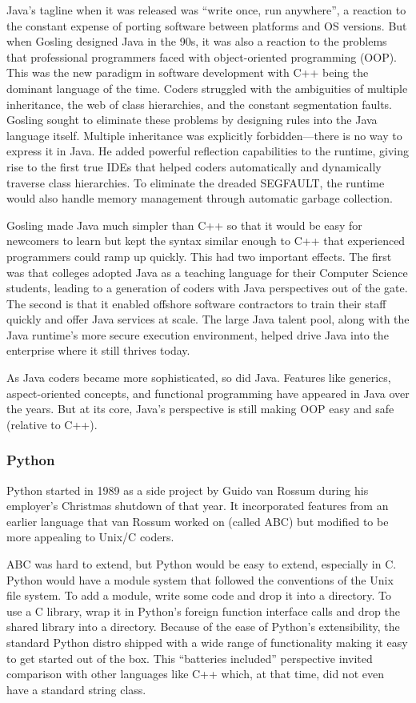 Java's tagline when it was released was ``write once, run anywhere'', a
reaction to the constant expense of porting software between platforms and OS
versions. But when Gosling designed Java in the 90s, it was also a reaction to
the problems that professional programmers faced with object-oriented
programming (OOP). This was the new paradigm in software development with C++
being the dominant language of the time. Coders struggled with the ambiguities
of multiple inheritance, the web of class hierarchies, and the constant
segmentation faults. Gosling sought to eliminate these problems by designing
rules into the Java language itself. Multiple inheritance was
explicitly forbidden---there is no way to express it in Java. He added
powerful reflection capabilities to the runtime, giving rise to the first true
IDEs that helped coders automatically and dynamically traverse class
hierarchies. To eliminate the dreaded SEGFAULT, the runtime would also handle
memory management through automatic garbage collection.

Gosling made Java much simpler than C++ so that it would be easy for newcomers
to learn but kept the syntax similar enough to C++ that experienced programmers
could ramp up quickly. This had two important effects. The first was that
colleges adopted Java as a teaching language for their Computer Science
students, leading to a generation of coders with Java perspectives out of the
gate. The second is that it enabled offshore software contractors to train
their staff quickly and offer Java services at scale. The large Java talent
pool, along with the Java runtime's more secure execution environment, helped
drive Java into the enterprise where it still thrives today.

As Java coders became more sophisticated, so did Java. Features like generics,
aspect-oriented concepts, and functional programming have appeared in Java over
the years. But at its core, Java's perspective is still making OOP easy and
safe (relative to C++).

\subsubsection{Python}

Python started in 1989 as a side project by Guido van Rossum during his
employer's Christmas shutdown of that year. It incorporated features from an
earlier language that van Rossum worked on (called ABC) but modified
to be more appealing to Unix/C coders.

ABC was hard to extend, but Python would be easy to extend, especially in C.
Python would have a module system that followed the conventions of the Unix
file system. To add a module, write some code and drop it into a directory. To
use a C library, wrap it in Python's foreign function interface calls and drop
the shared library into a directory.  Because of the ease of Python's
extensibility, the standard Python distro shipped with a wide range of
functionality making it easy to get started out of the box. This ``batteries
included'' perspective invited comparison with other languages like C++ which,
at that time, did not even have a standard string class.

